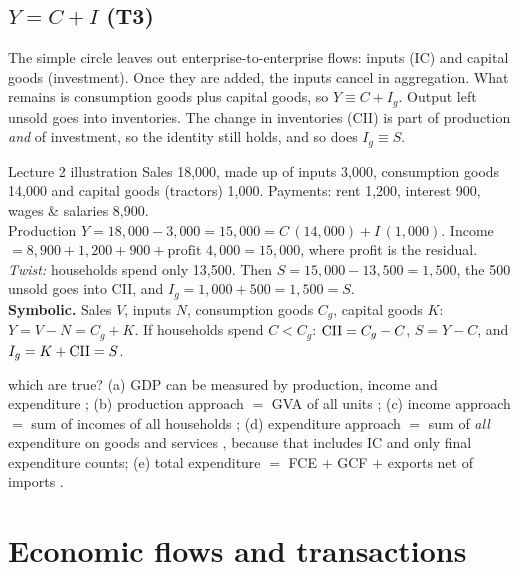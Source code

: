 \subsection*{\texorpdfstring{$Y = C + I$}{Y = C + I} (T3)}
The simple circle leaves out enterprise-to-enterprise flows: inputs (IC) and capital goods
(investment). Once they are added, the inputs cancel in aggregation. What remains is
consumption goods plus capital goods, so $Y \equiv C + I_g$. Output left unsold goes into
inventories. The change in inventories (CII) is part of production \emph{and} of investment, so
the identity still holds, and so does $I_g \equiv S$.

\begin{tmpl}{Lecture 2 illustration}
\small Sales 18,000, made up of inputs 3,000, consumption goods 14,000 and capital goods
(tractors) 1,000. Payments: rent 1,200, interest 900, wages \& salaries 8,900.\\
Production $Y = 18{,}000 - 3{,}000 = 15{,}000 = C\,(14{,}000) + I\,(1{,}000)$. Income
$= 8{,}900 + 1{,}200 + 900 + \text{profit }4{,}000 = 15{,}000$, where profit is the residual.\\
\emph{Twist:} households spend only 13,500. Then $S = 15{,}000 - 13{,}500 = 1{,}500$, the 500
unsold goes into CII, and $I_g = 1{,}000 + 500 = 1{,}500 = S$.\\[2pt]
\textbf{Symbolic.} Sales $V$, inputs $N$, consumption goods $C_g$, capital goods $K$:
$Y = V-N = C_g+K$. If households spend $C<C_g$: $\mathrm{CII}=C_g-C$, $S=Y-C$, and $I_g=K+\mathrm{CII}=S$.
\end{tmpl}

\begin{quick}{which are true?}
\small (a) GDP can be measured by production, income and expenditure \yes; (b) production approach
$=$ GVA of all units \yes; (c) income approach $=$ sum of incomes of all households \yes;
(d) expenditure approach $=$ sum of \emph{all} expenditure on goods and services \no, because that
includes IC and only final expenditure counts; (e) total expenditure $=$ FCE $+$ GCF $+$ exports
net of imports \yes.
\end{quick}

\section{Economic flows and transactions}\label{sec:flows}

